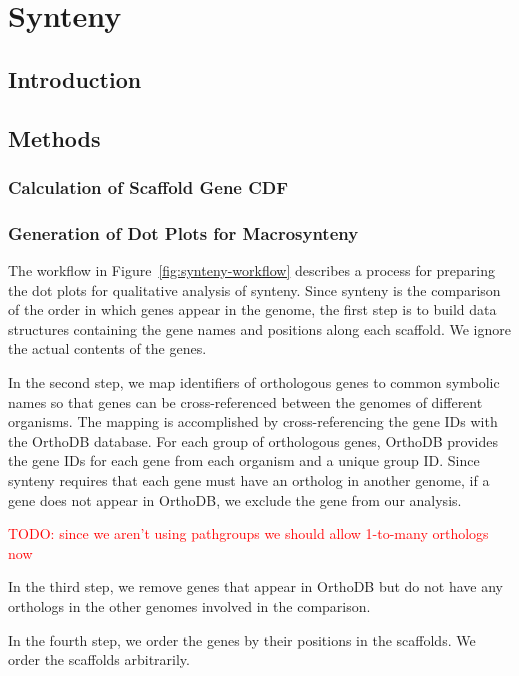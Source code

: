 \section{Synteny}

\subsection{Introduction}

\subsection{Methods}

\subsubsection{Calculation of Scaffold Gene CDF}

\subsubsection{Generation of Dot Plots for Macrosynteny}

The workflow in Figure~\ref{fig:synteny-workflow} describes a process for preparing the dot plots for qualitative analysis of synteny.  Since synteny is the comparison of the order in which genes appear in the genome, the first step is to build data structures containing the gene names and positions along each scaffold.  We ignore the actual contents of the genes.

In the second step, we map identifiers of orthologous genes to common symbolic names so that genes can be cross-referenced between the genomes of different organisms. The mapping is accomplished by cross-referencing the gene IDs with the OrthoDB database.  
For each group of orthologous genes, OrthoDB provides the gene IDs for each gene from each organism and a unique group ID. Since synteny requires that each gene must have an ortholog in another genome, if a gene does not appear in OrthoDB, we exclude the gene from our analysis. 

\textcolor{red}{TODO: since we aren't using pathgroups we should allow 1-to-many orthologs now}

In the third step, we remove genes that appear in OrthoDB but do not have any orthologs in the other genomes involved in the comparison.

In the fourth step, we order the genes by their positions in the scaffolds.  We order the scaffolds arbitrarily.

